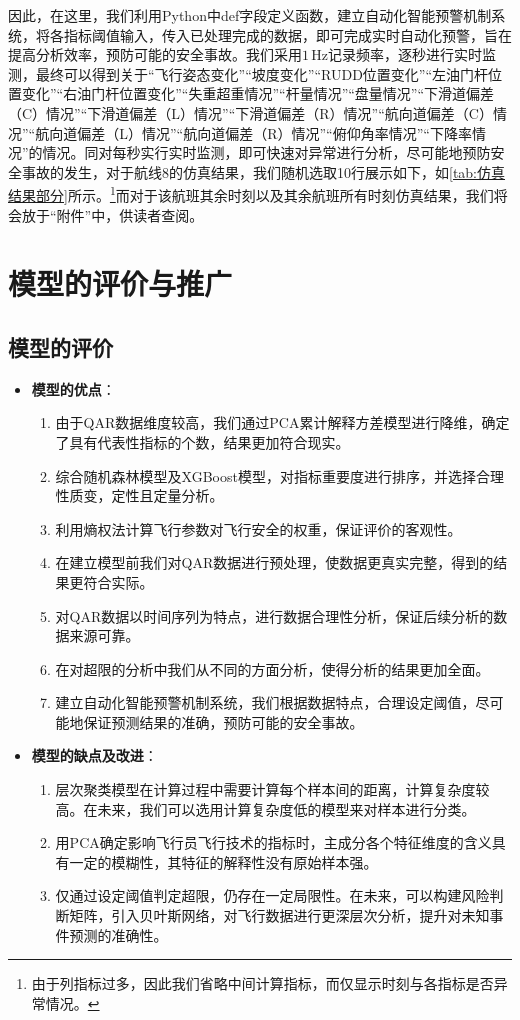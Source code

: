 \documentclass{MathorCupModeling}
\begin{document}
因此，在这里，我们利用Python中def字段定义函数，建立自动化智能预警机制系统，将各指标阈值输入，传入已处理完成的数据，即可完成实时自动化预警，旨在提高分析效率，预防可能的安全事故。我们采用$1\,\text{Hz}$记录频率，逐秒进行实时监测，最终可以得到关于“飞行姿态变化”“坡度变化”“RUDD位置变化”“左油门杆位置变化”“右油门杆位置变化”“失重超重情况”“杆量情况”“盘量情况”“下滑道偏差（C）情况”“下滑道偏差（L）情况”“下滑道偏差（R）情况”“航向道偏差（C）情况”“航向道偏差（L）情况”“航向道偏差（R）情况”“俯仰角率情况”“下降率情况”的情况。同对每秒实行实时监测，即可快速对异常进行分析，尽可能地预防安全事故的发生，对于航线8的仿真结果，我们随机选取10行展示如下，如\textcolor{blue}{\cref{tab:仿真结果部分}}所示。\textcolor{blue}{\footnote{由于列指标过多，因此我们省略中间计算指标，而仅显示时刻与各指标是否异常情况。}}而对于该航班其余时刻以及其余航班所有时刻仿真结果，我们将会放于“附件”中，供读者查阅。
  
\section{模型的评价与推广}
	\subsection{模型的评价}
	\begin{itemize}
		\item \textbf{模型的优点}：
			\begin{enumerate}
				\item 由于QAR数据维度较高，我们通过PCA累计解释方差模型进行降维，确定了具有代表性指标的个数，结果更加符合现实。
				\item 综合随机森林模型及XGBoost模型，对指标重要度进行排序，并选择合理性质变，定性且定量分析。
				\item 利用熵权法计算飞行参数对飞行安全的权重，保证评价的客观性。
				\item 在建立模型前我们对QAR数据进行预处理，使数据更真实完整，得到的结果更符合实际。
				\item 对QAR数据以时间序列为特点，进行数据合理性分析，保证后续分析的数据来源可靠。
				\item 在对超限的分析中我们从不同的方面分析，使得分析的结果更加全面。
				\item 建立自动化智能预警机制系统，我们根据数据特点，合理设定阈值，尽可能地保证预测结果的准确，预防可能的安全事故。
			\end{enumerate}
		\item \textbf{模型的缺点及改进}：
			\begin{enumerate}
				\item 层次聚类模型在计算过程中需要计算每个样本间的距离，计算复杂度较高。在未来，我们可以选用计算复杂度低的模型来对样本进行分类。
				\item 用PCA确定影响飞行员飞行技术的指标时，主成分各个特征维度的含义具有一定的模糊性，其特征的解释性没有原始样本强。
				\item 仅通过设定阈值判定超限，仍存在一定局限性。在未来，可以构建风险判断矩阵，引入贝叶斯网络，对飞行数据进行更深层次分析，提升对未知事件预测的准确性。
			\end{enumerate}
	\end{itemize}
\end{document}
